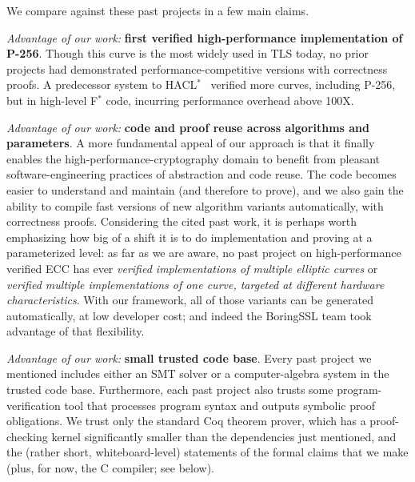 \documentclass[conference,letterpaper]{IEEEtran}
\begin{document}
We compare against these past projects in a few main claims.

\emph{Advantage of our work:} \textbf{first verified high-performance implementation of P-256}.
Though this curve is the most widely used in TLS today, no prior projects had demonstrated performance-competitive versions with correctness proofs.
A predecessor system to HACL$^*$~\cite{ECCstar} verified more curves, including P-256, but in high-level F$^*$ code, incurring performance overhead above 100X.

\emph{Advantage of our work:} \textbf{code and proof reuse across algorithms and parameters}.
A more fundamental appeal of our approach is that it finally enables the high-performance-cryptography domain to benefit from pleasant software-engineering practices of abstraction and code reuse.
The code becomes easier to understand and maintain (and therefore to prove), and we also gain the ability to compile fast versions of new algorithm variants automatically, with correctness proofs.
Considering the cited past work, it is perhaps worth emphasizing how big of a shift it is to do implementation and proving at a parameterized level: as far as we are aware, no past project on high-performance verified ECC has ever \emph{verified implementations of multiple elliptic curves} or \emph{verified multiple implementations of one curve, targeted at different hardware characteristics}.
With our framework, all of those variants can be generated automatically, at low developer cost; and indeed the BoringSSL team took advantage of that flexibility.

\emph{Advantage of our work:} \textbf{small trusted code base}.
Every past project we mentioned includes either an SMT solver or a computer-algebra system in the trusted code base.
Furthermore, each past project also trusts some program-verification tool that processes program syntax and outputs symbolic proof obligations.
We trust only the standard Coq theorem prover, which has a proof-checking kernel significantly smaller than the dependencies just mentioned, and the (rather short, whiteboard-level) statements of the formal claims that we make (plus, for now, the C compiler; see below).
\end{document}
